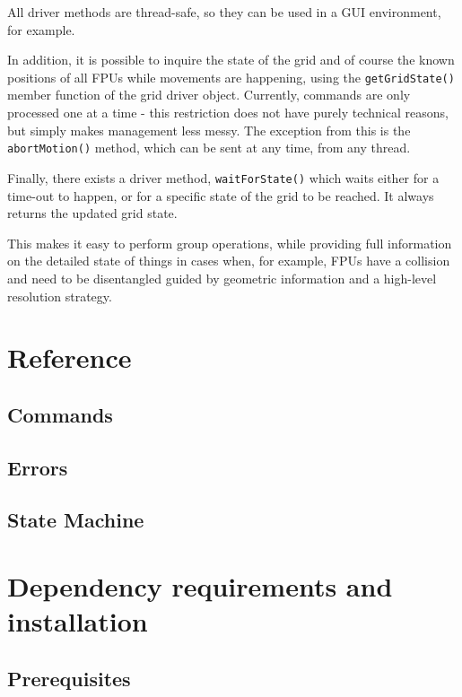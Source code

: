 \documentclass{scrartcl}[12pt,a4paper]
\begin{document}
All driver methods are thread-safe, so they can be used in a GUI
environment, for example.

In addition, it is possible to inquire the state of the grid and of
course the known positions of all FPUs while movements are happening,
using the \texttt{getGridState()} member function of the grid driver
object. Currently, commands are only processed one at a time - this
restriction does not have purely technical reasons, but simply makes
management less messy. The exception from this is the
\texttt{abortMotion()} method, which can be sent at any time, from any
thread.

Finally, there exists a driver method, \texttt{waitForState()} which
waits either for a time-out to happen, or for a specific state of the
grid to be reached. It always returns the updated grid state.

This makes it easy to perform group operations, while providing full
information on the detailed state of things in cases when, for
example, FPUs have a collision and need to be disentangled guided by
geometric information and a high-level resolution strategy.



\section{Reference}
\subsection{Commands}
\subsection{Errors}
\subsection{State Machine}

\appendix

\section{Dependency requirements and installation}



\subsection{Prerequisites}
\end{document}
